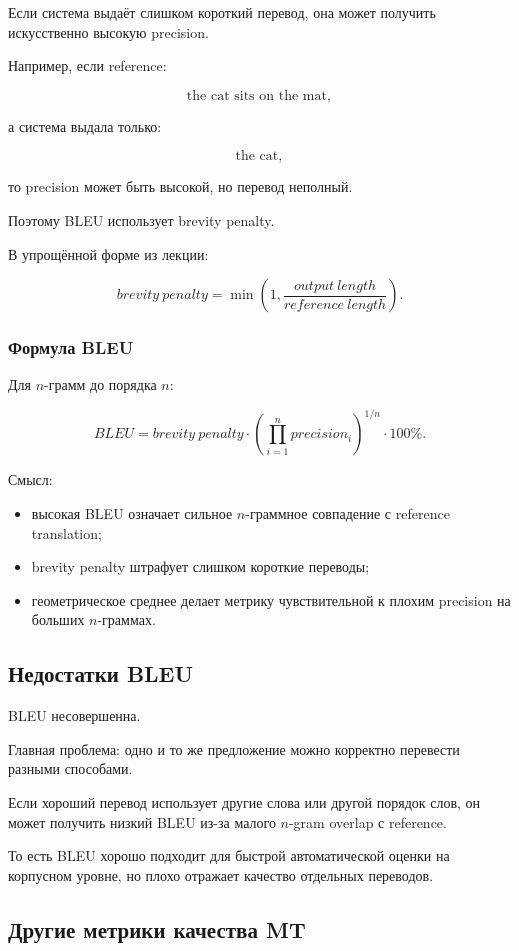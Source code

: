 \documentclass[a4paper,12pt]{article}
\begin{document}
Если система выдаёт слишком короткий перевод, она может получить искусственно высокую precision.

Например, если reference:

\[
\text{the cat sits on the mat},
\]

а система выдала только:

\[
\text{the cat},
\]

то precision может быть высокой, но перевод неполный.

Поэтому BLEU использует brevity penalty.

В упрощённой форме из лекции:

\[
brevity\ penalty
=
\min
\left(
1,
\frac{output\ length}{reference\ length}
\right).
\]

\subsubsection{Формула BLEU}

Для \(n\)-грамм до порядка \(n\):

\[
BLEU
=
brevity\ penalty
\cdot
\left(
\prod_{i=1}^{n}
precision_i
\right)^{1/n}
\cdot
100\%.
\]

Смысл:

\begin{itemize}
    \item высокая BLEU означает сильное \(n\)-граммное совпадение с reference translation;
    \item brevity penalty штрафует слишком короткие переводы;
    \item геометрическое среднее делает метрику чувствительной к плохим precision на больших \(n\)-граммах.
\end{itemize}

\subsection{Недостатки BLEU}

BLEU несовершенна.

Главная проблема: одно и то же предложение можно корректно перевести разными способами.

Если хороший перевод использует другие слова или другой порядок слов, он может получить низкий BLEU из-за малого \(n\)-gram overlap с reference.

То есть BLEU хорошо подходит для быстрой автоматической оценки на корпусном уровне, но плохо отражает качество отдельных переводов.

\subsection{Другие метрики качества MT}
\end{document}
